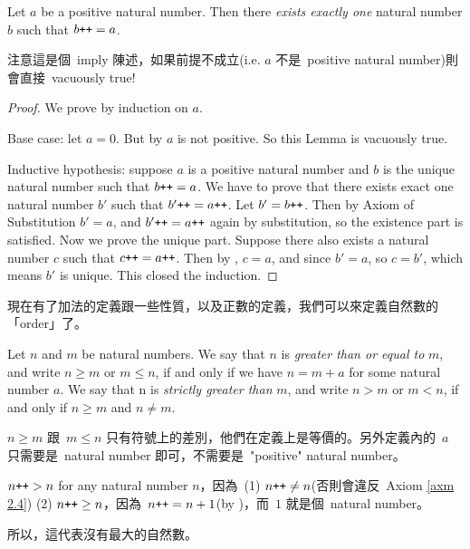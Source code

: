 \begin{lemma}\label{lem 2.2.10}
Let \(a\) be a positive natural number. Then there \emph{exists exactly one} natural number \(b\) such that \(b\texttt{++} = a\).
\end{lemma}
\begin{note}
注意這是個\ imply 陳述，如果前提不成立(i.e. \(a\) 不是\ positive natural number)則會直接\ vacuously true!
\end{note}
\begin{proof}
We prove by induction on \(a\).

Base case: let \(a = 0\). But by  \(a\) is not positive. So this Lemma is vacuously true.

Inductive hypothesis: suppose \(a\) is a positive natural number and \(b\) is the unique natural number such that \(b\texttt{++} = a\). We have to prove that there exists exact one natural number \(b'\) such that \(b'\texttt{++} = a\texttt{++}\). Let \(b' = b\texttt{++}\). Then by Axiom of Substitution  \(b' = a\), and \(b'\texttt{++} = a\texttt{++}\) again by substitution, so the existence part is satisfied. Now we prove the unique part. Suppose there also exists a natural number \(c\) such that \(c\texttt{++} = a\texttt{++}\). Then by , \(c = a\), and since \(b' = a\), so \(c = b'\), which means \(b'\) is unique. This closed the induction.
\end{proof}

\begin{note}
現在有了加法的定義跟一些性質，以及正數的定義，我們可以來定義自然數的「order」了。
\end{note}

\begin{definition} \label{def 2.2.11} Let \(n\) and \(m\) be natural numbers. We say that \(n\) is \emph{greater than or equal to} \(m\), and write \(n \geq m\) or \(m \leq n\), if and only if we have \(n = m + a\) for some natural number \(a\). We say that n is \emph{strictly greater than} \(m\), and write \(n > m\) or \(m < n\), if and only if \(n \geq m\) and \(n \neq m\).
\end{definition}
\begin{note}
\(n \geq m\) 跟\ \(m \leq n\) 只有符號上的差別，他們在定義上是等價的。另外定義內的\ \(a\) 只需要是\ natural number 即可，不需要是\ "positive" natural number。
\end{note}
\begin{additional corollary} \label{ac 2.2.3}
\(n\texttt{++} > n\) for any natural number \(n\)，因為\ (1) \(n\texttt{++} \neq n\)(否則會違反\ Axiom \ref{axm 2.4}) (2) \(n\texttt{++} \geq n\)，因為\ \(n\texttt{++} = n + 1\)(by )，而\ \(1\) 就是個\ natural number。

所以，這代表沒有最大的自然數。
\end{additional corollary}

